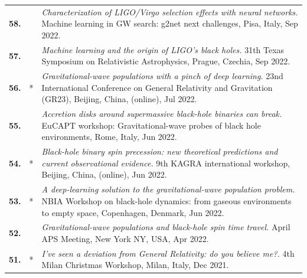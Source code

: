 {\begin{longtable}{rp{0.3cm}p{15.8cm}}
%
\textbf{58.} &  & \textit{Characterization of LIGO/Virgo selection effects with neural networks.}
\newline{}
Machine learning in GW search: g2net next challenges, Pisa, Italy, Sep 2022.
\vspace{0.05cm}\\
%
\textbf{57.} &  & \textit{Machine learning and the origin of LIGO's black holes.}
\newline{}
31th Texas Symposium on Relativistic Astrophysics, Prague, Czechia, Sep 2022.
\vspace{0.05cm}\\
%
\textbf{56.} & * & \textit{Gravitational-wave populations with a pinch of deep learning.}
\newline{}
23nd International Conference on General Relativity and Gravitation (GR23), Beijing, China, (online), Jul 2022.
\vspace{0.05cm}\\
%
\textbf{55.} &  & \textit{Accretion disks around supermassive black-hole binaries can break.}
\newline{}
EuCAPT workshop: Gravitational-wave probes of black hole environments, Rome, Italy, Jun 2022.
\vspace{0.05cm}\\
%
\textbf{54.} & * & \textit{Black-hole binary spin precession: new theoretical predictions and current observational evidence.}
\newline{}
9th KAGRA international workshop, Beijing, China, (online), Jun 2022.
\vspace{0.05cm}\\
%
\textbf{53.} & * & \textit{A deep-learning solution to the gravitational-wave population problem.}
\newline{}
NBIA Workshop on black-hole dynamics: from gaseous environments to empty space, Copenhagen, Denmark, Jun 2022.
\vspace{0.05cm}\\
%
\textbf{52.} &  & \textit{Gravitational-wave populations and black-hole spin time travel.}
\newline{}
April APS Meeting, New York NY, USA, Apr 2022.
\vspace{0.05cm}\\
%
\textbf{51.} & * & \textit{I've seen a deviation from General Relativity: do you believe me?.}
\newline{}
4th Milan Christmas Workshop, Milan, Italy, Dec 2021.
\vspace{0.05cm}\\

\end{longtable}}
